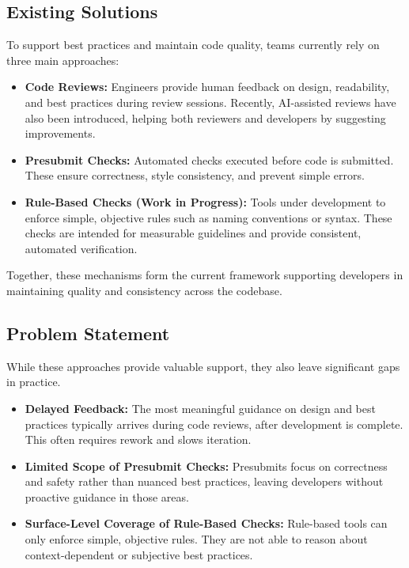\begin{spacing}{1.2}
\subsection{Existing Solutions}
To support best practices and maintain code quality, teams currently rely on three main approaches:
\begin{itemize}
    \item \textbf{Code Reviews:} Engineers provide human feedback on design, readability, and best practices during review sessions. Recently, AI-assisted reviews have also been introduced, helping both reviewers and developers by suggesting improvements.
    
    \item \textbf{Presubmit Checks:} Automated checks executed before code is submitted. These ensure correctness, style consistency, and prevent simple errors.
    
    \item \textbf{Rule-Based Checks (Work in Progress):} Tools under development to enforce simple, objective rules such as naming conventions or syntax. These checks are intended for measurable guidelines and provide consistent, automated verification.
\end{itemize}

Together, these mechanisms form the current framework supporting developers in maintaining quality and consistency across the codebase.

\subsection{Problem Statement}
While these approaches provide valuable support, they also leave significant gaps in practice.  
\begin{itemize}
    \item \textbf{Delayed Feedback:} The most meaningful guidance on design and best practices typically arrives during code reviews, after development is complete. This often requires rework and slows iteration.  
    \item \textbf{Limited Scope of Presubmit Checks:} Presubmits focus on correctness and safety rather than nuanced best practices, leaving developers without proactive guidance in those areas.  
    \item \textbf{Surface-Level Coverage of Rule-Based Checks:} Rule-based tools can only enforce simple, objective rules. They are not able to reason about context-dependent or subjective best practices.  
\end{itemize}


\end{spacing}
